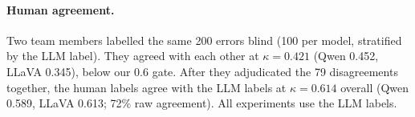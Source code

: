 \paragraph{Human agreement.} Two team members labelled the same 200 errors
blind (100 per model, stratified by the LLM label). They agreed with each other at
$\kappa=0.421$ (Qwen 0.452, LLaVA 0.345), below our 0.6 gate. After they
adjudicated the 79 disagreements together, the human labels agree with the LLM
labels at $\kappa=0.614$ overall (Qwen 0.589, LLaVA 0.613; 72\% raw agreement).
All experiments use the LLM labels.
